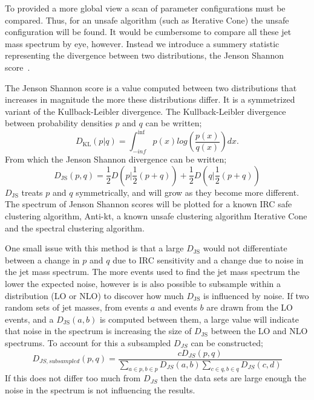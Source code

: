     To provided a more global view a scan of parameter configurations must be compared.
    Thus, for an unsafe algorithm (such as Iterative Cone) the unsafe configuration
    will be found.
    It would be cumbersome to compare all these jet mass spectrum by eye, however.
    Instead we introduce a summery statistic representing the divergence between two distributions,
    the Jenson Shannon score~\cite{jensen_shannon}.

    The Jenson Shannon score is a value computed between two distributions that increases in magnitude the more these distributions differ.
    It is a symmetrized variant of the Kullback-Leibler divergence.
    The Kullback-Leibler divergence between probability densities \(p\) and \(q\) can be written;
    \[D_\text{KL} (p | q) = \int^{\inf}_{-inf} p(x) log\left(\frac{p(x)}{q(x)}\right) dx.\]
    From which the Jenson Shannon divergence can be written;
    \[D_\text{JS}(p, q) = \frac{1}{2}D\left(p | \frac{1}{2}(p + q)\right) + \frac{1}{2}D\left(q | \frac{1}{2}(p + q)\right)\]
    \(D_\text{JS}\) treats \(p\) and \(q\) symmetrically, and will grow as they become more different.
    The spectrum of Jenson Shannon scores will be plotted for a known IRC safe clustering algorithm, Anti-kt,
    a known unsafe clustering algorithm Iterative Cone and the spectral clustering algorithm.

    One small issue with this method is that a large \(D_\text{JS}\) would not differentiate
    between a change in \(p\) and \(q\) due to IRC sensitivity and 
    a change due to noise in the jet mass spectrum.
    The more events used to find the jet mass spectrum the lower the expected noise,
    however is is also possible to subsample within a distribution (LO or NLO)
    to discover how much \(D_\text{JS}\) is influenced by noise.
    If two random sets of jet masses, from events \(a\) and events \(b\) are drawn from the LO events,
    and a \(D_\text{JS}(a, b)\) is computed between them, a large value will indicate that 
    noise in the spectrum is increasing the size of \(D_\text{JS}\) between the LO and NLO spectrums.
    To account for this a subsampled \(D_{JS}\) can be constructed;
    \[D_{JS, subsampled}(p, q) = \frac{cD_{JS}(p, q)}{\sum_{a \in p, b \in p} D_{JS}(a, b)\sum_{c \in q, b \in q} D_{JS}(c, d)}\]
    If this does not differ too much from \(D_{JS}\) then the data sets are large enough the noise in
    the spectrum is not influencing the results.
